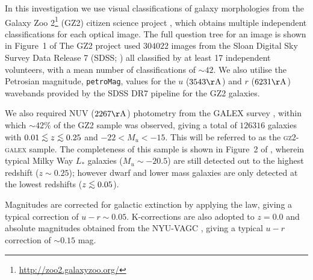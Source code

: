 \documentclass[useAMS,usenatbib]{mn2e}
\def\lesssim{\mathrel{\hbox{\rlap{\hbox{\lower3pt\hbox{$\sim$}}}\hbox{\raise2pt\hbox{$<$}}}}}
\def\minor		{\color{minorcol}}
\begin{document}
In this investigation we use visual classifications of galaxy morphologies from the Galaxy Zoo 2\footnote{\url{http://zoo2.galaxyzoo.org/}} (GZ2) citizen science project \citep{lintott09, GZ2}, which obtains multiple independent classifications for each optical image. The full question tree for an image is shown in Figure~1 of \citeauthor{GZ2}  The GZ2 project used $304022$ images from the Sloan Digital Sky Survey Data Release 7 (SDSS; \citealt{york00, abazajian09}) all classified by at least 17 independent volunteers, with a mean number of classifications of $\sim42$. We also utilise the Petrosian magnitude, {\tt petroMag}, values for the $u$ ($3543 \rm{\AA}$) and $r$ ($6231 \rm{\AA}$) wavebands provided by the SDSS DR7 pipeline \citep{stoughton02} for the GZ2 galaxies.

We also required NUV ($2267 \rm{\AA}$) photometry from the GALEX survey \citep{martin05}, within which $\sim42\%$ of the GZ2 sample was observed, giving a total of $126316$ galaxies with $0.01 \lesssim z \lesssim 0.25$ {\minor and $-22 < M_{u} < -15$}. This will be referred to as the \textsc{gz2-galex} sample. The completeness of this sample is shown in Figure~2 of \cite{smethurst15}, {\minor wherein typical Milky Way $L_{*}$ galaxies ($M_u \sim −20.5$) are still detected out to the highest redshift ($z \sim 0.25$); however dwarf and lower mass galaxies are only detected at the lowest redshifts ($z\lesssim0.05$).}

Magnitudes are corrected for galactic extinction \citep{Oh11} by applying the \citet{Cardelli89} law, giving a typical correction of $u-r \sim 0.05$. K-corrections are also adopted to $z=0.0$ and absolute magnitudes obtained from the NYU-VAGC \citep{Blanton05, padmanabhan08, blanton07}, giving a typical $u-r$ correction of $\sim 0.15$ mag. %

\end{document}
